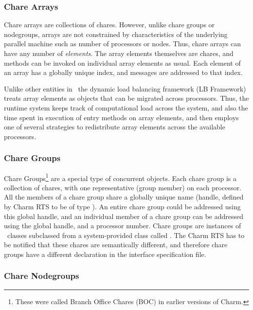 \subsubsection{Chare Arrays}

Chare arrays are collections of chares. However, unlike chare groups or
nodegroups, arrays are not constrained by characteristics of the underlying
parallel machine such as number of processors or nodes. Thus, chare arrays
can have any number of {\em elements}. The array elements themselves are
chares, and methods can be invoked on individual array elements as usual.  
Each element of an array has a globally unique index, and messages are
addressed to that index.

Unlike other entities in \charmpp\, the dynamic load balancing framework (LB
Framework) treats array elements as objects that can be migrated across
processors. Thus, the runtime system keeps track of computational load
across the system, and also the time spent in execution of entry methods on
array elements, and then employs one of several strategies to redistribute
array elements across the available processors.

\subsubsection{Chare Groups}

Chare Groups\footnote{ These were called Branch Office Chares (BOC) in earlier
versions of Charm.} are a special type of concurrent objects.  Each chare group
is a collection of chares, with one representative (group member) on each
processor. All the members of a chare group share a globally unique name
(handle, defined by Charm RTS to be of type ). An entire chare
group could be addressed using this global handle, and an individual member of
a chare group can be addressed using the global handle, and a processor number.
Chare groups are instances of \CC\ classes subclassed from a system-provided
class called . The Charm RTS has to be notified that these chares
are semantically different, and therefore chare groups have a different
declaration in the interface specification file.

\subsubsection{Chare Nodegroups}

